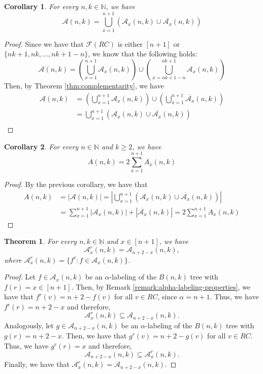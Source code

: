 \documentclass[10pt]{article}
\newtheorem{theorem}{Theorem}
\newtheorem{corollary}{Corollary}[theorem]
\theoremstyle{definition}
\begin{document}
\begin{corollary}
  For every $n, k \in \mathbb{N}$, we have
  $$
  \mathcal{A}(n, k) = \bigcup_{x = 1}^{n + 1} (\mathcal{A}_x(n, k) \cup \overline{\mathcal{A}_x}(n, k))
  $$
\end{corollary}

\begin{proof}
  Since we have that $\mathcal{F}(RC)$ is either $[n + 1]$ or $\{nk + 1, nk, \dots, nk + 1 - n\}$, we know that the following holds:
  $$
  \mathcal{A}(n, k) = \left(\bigcup_{x = 1}^{n + 1} \mathcal{A}_x(n, k)\right) \cup \left(\bigcup_{x = nk + 1 - n}^{nk + 1} \mathcal{A}_x(n, k)\right)
  $$
  Then, by Theorem \ref{thm:complementarity}, we have
  \begin{align*}
    \mathcal{A}(n, k) &= \left(\bigcup_{x = 1}^{n + 1} \mathcal{A}_x(n, k)\right) \cup \left(\bigcup_{x = 1}^{n + 1} \overline{\mathcal{A}_x}(n, k)\right)\\
    &= \bigcup_{x = 1}^{n + 1} (\mathcal{A}_x(n, k) \cup \overline{\mathcal{A}_x}(n, k)) \\
  \end{align*}
\end{proof}

\begin{corollary}
  For every $n \in \mathbb{N}$ and $k \ge 2$, we have
  $$
  A(n, k) = 2 \sum_{x = 1}^{n + 1} A_x(n, k)
  $$
\end{corollary}

\begin{proof}
  By the previous corollary, we have that
  \begin{align*}
    A(n, k) &= |\mathcal{A}(n, k)| = \left|\bigcup_{x = 1}^{n + 1} (\mathcal{A}_x(n, k) \cup \overline{\mathcal{A}_x}(n, k))\right|\\
    &= \sum_{x = 1}^{n + 1} |\mathcal{A}_x(n, k)| + |\overline{\mathcal{A}_x}(n, k)| = 2 \sum_{x = 1}^{n + 1} A_x(n, k)
  \end{align*}
\end{proof}

\begin{theorem}
  \label{thm:reversability}
  For every $n, k \in \mathbb{N}$ and $x \in [n + 1]$, we have
  $$
  \mathcal{A}^r_x(n, k) = \mathcal{A}_{n + 2 - x}(n, k),
  $$
  where $\mathcal{A}^r_x(n, k) = \{f^r : f \in \mathcal{A}_x(n, k)\}$.
\end{theorem}

\begin{proof}
  Let $f \in \mathcal{A}_x(n, k)$ be an $\alpha$-labeling of the $B(n, k)$ tree with $f(r) = x \in [n + 1]$. Then, by Remark \ref{remark:alpha-labeling-properties}, we have that $f^r(v) = n + 2 - f(v)$ for all $v \in RC$, since $\alpha = n + 1$. Thus, we have $f^r(r) = n + 2 - x$ and therefore,
  $$
  \mathcal{A}^r_x(n, k) \subseteq \mathcal{A}_{n + 2 - x}(n, k).
  $$
  Analogously, let $g \in \mathcal{A}_{n + 2 - x}(n, k)$ be an $\alpha$-labeling of the $B(n, k)$ tree with $g(r) = n + 2 - x$. Then, we have that $g^r(v) = n + 2 - g(v)$ for all $v \in RC$. Thus, we have $g^r(r) = x$ and therefore,
  $$
  \mathcal{A}_{n + 2 - x}(n, k) \subseteq \mathcal{A}^r_x(n, k).
  $$
  Finally, we have that $\mathcal{A}^r_x(n, k) = \mathcal{A}_{n + 2 - x}(n, k)$.
\end{proof}
\end{document}

